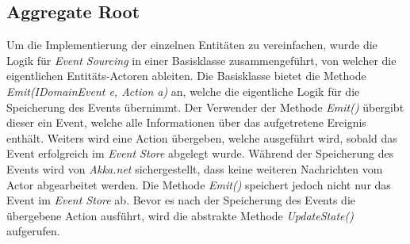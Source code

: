 \subsection{Aggregate Root}
Um die Implementierung der einzelnen Entitäten zu vereinfachen, wurde die Logik für \textit{Event Sourcing} in einer Basisklasse zusammengeführt, von welcher die eigentlichen Entitäts-Actoren ableiten. 
Die Basisklasse bietet die Methode \textit{Emit(IDomainEvent e, Action a)} an, welche die eigentliche Logik für die Speicherung des Events übernimmt. Der Verwender der Methode \textit{Emit()} übergibt dieser ein Event, welche alle Informationen über das aufgetretene Ereignis enthält. Weiters wird eine Action übergeben, welche ausgeführt wird, sobald das Event erfolgreich im \textit{Event Store} abgelegt wurde. Während der Speicherung des Events wird von \textit{Akka.net} sichergestellt, dass keine weiteren Nachrichten vom Actor abgearbeitet werden. Die Methode \textit{Emit()} speichert jedoch nicht nur das Event im \textit{Event Store} ab. Bevor es nach der Speicherung des Events die übergebene Action ausführt, wird die abstrakte Methode \textit{UpdateState()} aufgerufen. \\
% 
% 
% 
% 
% 
% 
% 
